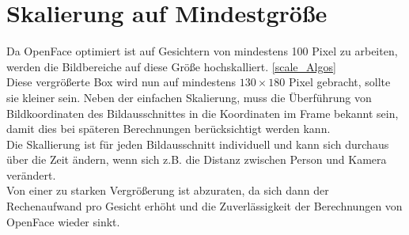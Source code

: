 \section{Skalierung auf Mindestgröße}
\label{skalierung}
Da OpenFace optimiert ist auf Gesichtern von mindestens 100 Pixel zu arbeiten, werden die Bildbereiche auf diese Größe hochskalliert. \ref{scale_Algos}\\
Diese vergrößerte Box wird nun auf mindestens $130 \times 180$ Pixel gebracht, sollte sie kleiner sein.  Neben der einfachen Skalierung, muss die Überführung von Bildkoordinaten des Bildausschnittes in die Koordinaten im Frame bekannt sein, damit dies bei späteren Berechnungen berücksichtigt werden kann.\\
Die Skallierung ist für jeden Bildausschnitt individuell und kann sich durchaus über die Zeit ändern, wenn sich z.B. die Distanz zwischen Person und Kamera verändert.\\
Von einer zu starken Vergrößerung ist abzuraten, da sich dann der Rechenaufwand pro Gesicht erhöht und die Zuverlässigkeit der Berechnungen von OpenFace wieder sinkt.